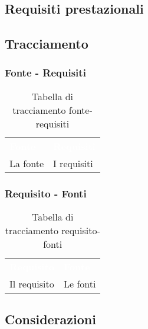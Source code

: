 	\subsection{Requisiti prestazionali}



	\subsection{Tracciamento}
		
		\subsubsection{Fonte - Requisiti}

\begin{table}[H]
\centering\renewcommand{\arraystretch}{1.5}
\caption{Tabella di tracciamento fonte-requisiti}
\vspace{0.2cm}
\begin{tabular}{ C{4 cm} C{4 cm}}
\textcolor{white}{\textbf{Fonte}} & \textcolor{white}{\textbf{Requisiti}}\\
La fonte & I requisiti\\
\end{tabular}
\end{table}			

		\subsubsection{Requisito - Fonti}

\begin{table}[H]
\centering\renewcommand{\arraystretch}{1.5}
\caption{Tabella di tracciamento requisito-fonti}
\vspace{0.2cm}
\begin{tabular}{ C{4 cm} C{4 cm}}
\textcolor{white}{\textbf{Requisito}} & \textcolor{white}{\textbf{Fonte}}\\
Il requisito & Le fonti\\
\end{tabular}
\end{table}
	

	\subsection{Considerazioni}

